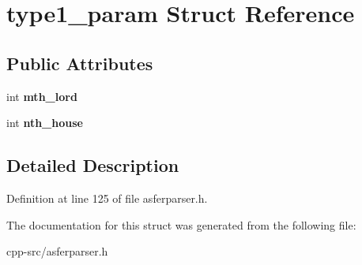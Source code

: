 \hypertarget{structtype1__param}{\section{type1\-\_\-param Struct Reference}
\label{structtype1__param}
}
\subsection*{Public Attributes}
\begin{DoxyCompactItemize}
\item 
\hypertarget{structtype1__param_abefaa02dd0f2fe1ce90a296a64efb5be}{int {\bfseries mth\-\_\-lord}}\label{structtype1__param_abefaa02dd0f2fe1ce90a296a64efb5be}

\item 
\hypertarget{structtype1__param_ab94f17629da8ab65e17caeb01ea6a750}{int {\bfseries nth\-\_\-house}}\label{structtype1__param_ab94f17629da8ab65e17caeb01ea6a750}

\end{DoxyCompactItemize}


\subsection{Detailed Description}


Definition at line 125 of file asferparser.\-h.



The documentation for this struct was generated from the following file\-:\begin{DoxyCompactItemize}
\item 
cpp-\/src/asferparser.\-h\end{DoxyCompactItemize}
